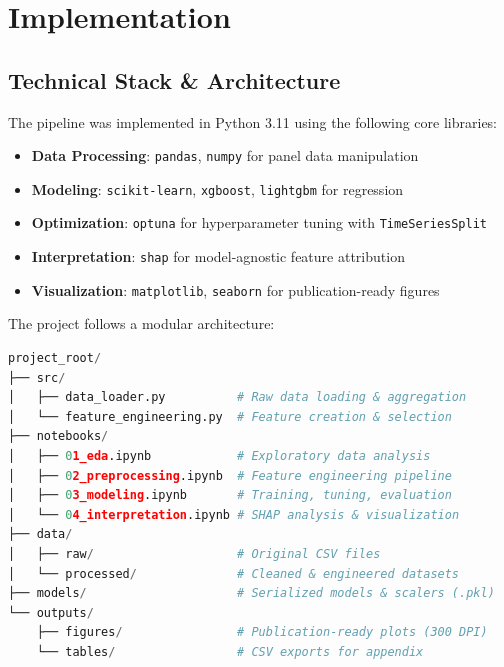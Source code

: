 \documentclass[12pt, a4paper]{article}
\begin{document}
\section{Implementation}

\subsection{Technical Stack \& Architecture}
The pipeline was implemented in Python 3.11 using the following core libraries:
\begin{itemize}[leftmargin=*]
    \item \textbf{Data Processing}: \texttt{pandas}, \texttt{numpy} for panel data manipulation
    \item \textbf{Modeling}: \texttt{scikit-learn}, \texttt{xgboost}, \texttt{lightgbm} for regression
    \item \textbf{Optimization}: \texttt{optuna} for hyperparameter tuning with \texttt{TimeSeriesSplit}
    \item \textbf{Interpretation}: \texttt{shap} for model-agnostic feature attribution
    \item \textbf{Visualization}: \texttt{matplotlib}, \texttt{seaborn} for publication-ready figures
\end{itemize}

The project follows a modular architecture:
\begin{lstlisting}[language=Python, caption={Project structure overview}, label=lst:structure]
project_root/
├── src/
│   ├── data_loader.py          # Raw data loading & aggregation
│   └── feature_engineering.py  # Feature creation & selection
├── notebooks/
│   ├── 01_eda.ipynb            # Exploratory data analysis
│   ├── 02_preprocessing.ipynb  # Feature engineering pipeline
│   ├── 03_modeling.ipynb       # Training, tuning, evaluation
│   └── 04_interpretation.ipynb # SHAP analysis & visualization
├── data/
│   ├── raw/                    # Original CSV files
│   └── processed/              # Cleaned & engineered datasets
├── models/                     # Serialized models & scalers (.pkl)
└── outputs/
    ├── figures/                # Publication-ready plots (300 DPI)
    └── tables/                 # CSV exports for appendix
\end{lstlisting}
\end{document}
